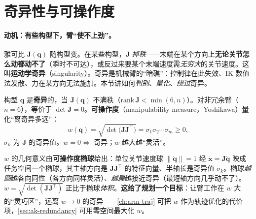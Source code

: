 \section{奇异性与可操作度}
\label{sec:ak-singularity}

\paragraph{动机：有些构型下，臂“使不上劲”。}
雅可比 $\mathbf{J}(\mathbf{q})$ 随构型变。在某些构型，$\mathbf{J}$ \emph{掉秩}——末端在某个方向上\textbf{无论关节怎么动都动不了}（瞬时不可达），或反过来要某个末端速度需\emph{无穷大}的关节速度。这叫\textbf{运动学奇异}（singularity）。奇异是机械臂的“暗礁”：控制律在此失效、IK 数值法发散、力在某方向无法施加。本节讲如何\emph{判别}、\emph{量化}、\emph{绕过}奇异。

\begin{definition}[运动学奇异与可操作度]\label{def:ak-singularity}
构型 $\mathbf{q}$ 是\textbf{奇异}的，当 $\mathbf{J}(\mathbf{q})$ 不满秩（$\mathrm{rank}\,\mathbf{J}<\min(6,n)$）。对非冗余臂（$n=6$），等价于 $\det\mathbf{J}=0$。\textbf{可操作度}（manipulability measure，Yoshikawa）量化“离奇异多远”\cite{lynch2017modern}：
\begin{equation}
  \boxed{w(\mathbf{q})=\sqrt{\det\!\big(\mathbf{J}\mathbf{J}^\top\big)}=\sigma_1\sigma_2\cdots\sigma_m\ge0,}
  \label{eq:ak-manip}
\end{equation}
$\sigma_k$ 为 $\mathbf{J}$ 的奇异值。$w=0\iff$ 奇异；$w$ 越大越“灵活”。
\end{definition}

\begin{insight}
$w$ 的几何意义由\textbf{可操作度椭球}给出\cite{lynch2017modern}：单位关节速度球 $\|\dot{\mathbf{q}}\|=1$ 经 $\dot{\mathbf{x}}=\mathbf{J}\dot{\mathbf{q}}$ 映成任务空间一个椭球，其主轴方向是 $\mathbf{J}\mathbf{J}^\top$ 的特征向量、半轴长是奇异值 $\sigma_k$。椭球\emph{越圆}越各向同性（各方向同样灵活）、\emph{越扁}越接近奇异（最短轴方向几乎动不了）。$w=\sqrt{\det(\mathbf{J}\mathbf{J}^\top)}$ 正比于椭球\emph{体积}。\textbf{这给了规划一个目标}：让臂工作在 $w$ 大的“灵巧区”，远离 $w\to0$ 的奇异——\cref{ch:arm-traj} 可把 $w$ 作为轨迹优化的代价项，\cref{sec:ak-redundancy} 可用零空间最大化 $w$。
\end{insight}

